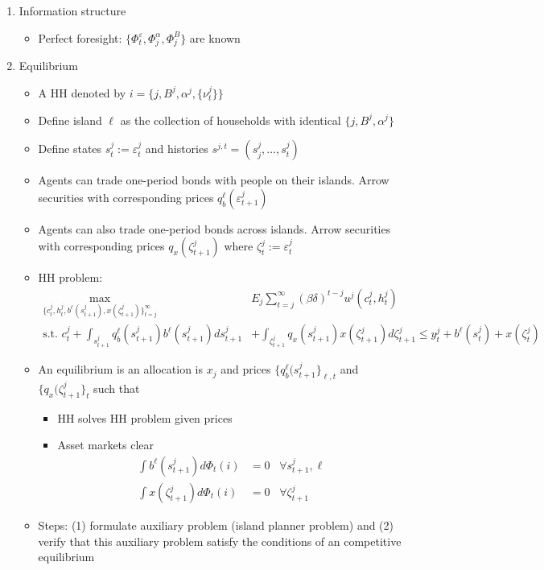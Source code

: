 \documentclass{article}
\begin{document}
\begin{enumerate}
\item Information structure

\begin{itemize}
\item Perfect foresight: $\{ \Phi_t^\varepsilon, \Phi_j^\alpha, \Phi_j^B \}$ are known
\end{itemize}


\item Equilibrium

\begin{itemize}
\item A HH denoted by $i = \{j, B^j, \alpha^j, \{ \nu_t^j \}\}$
\item Define island $\ell$ as the collection of households with identical $\{j, B^j, \alpha^j\}$
\item Define states $s_t^j := \varepsilon_t^j$ and histories $s^{j,t} = (s_j^j, ..., s_t^j)$
\item Agents can trade one-period bonds with people on their islands. Arrow securities with corresponding prices $q_b^\ell(\varepsilon_{t+1}^j)$
\item Agents can also trade one-period bonds across islands. Arrow securities with corresponding prices $q_x(\zeta_{t+1}^j)$  where $\zeta_t^j := \varepsilon_t^j$
\item HH problem:
\begin{align*}
\max_{\{c_t^j, h_t^j, b^\ell(s_{t+1}^j), x (\zeta_{t+1}^j)\}_{t=j}^\infty} & E_j \sum_{t=j}^\infty (\beta \delta)^{t-j} u^j(c_t^j, h_t^j)\\
\text{s.t. } c_t^j + \int_{s_{t+1}^j} q_b^\ell(s_{t+1}^j) b^\ell(s_{t+1}^j) ds_{t+1}^j &+ \int_{\zeta_{t+1}^j} q_x(s_{t+1}^j) x(\zeta_{t+1}^j) d\zeta_{t+1}^j \le y_t^j + b^\ell(s_t^j) + x(\zeta_t^j)
\end{align*}
\item An equilibrium is an allocation is $x_j$ and prices $\{q_b^\ell(s_{t+1}^j\}_{\ell, t}$ and $\{q_x(\zeta_{t+1}^j\}_t$ such that
\begin{itemize}
\item HH solves HH problem given prices
\item Asset markets clear
\begin{align*}
\int b^\ell(s_{t+1}^j) d \Phi_t(i) &= 0 \;\;\; \forall s_{t+1}^j, \ell\\
\int x(\zeta_{t+1}^j) d \Phi_t(i) &= 0 \;\;\; \forall \zeta_{t+1}^j
\end{align*}
\end{itemize}
\item Steps: (1) formulate auxiliary problem (island planner problem) and (2) verify that this auxiliary problem satisfy the conditions of an competitive equilibrium
\end{itemize}


\end{enumerate}
\end{document}
